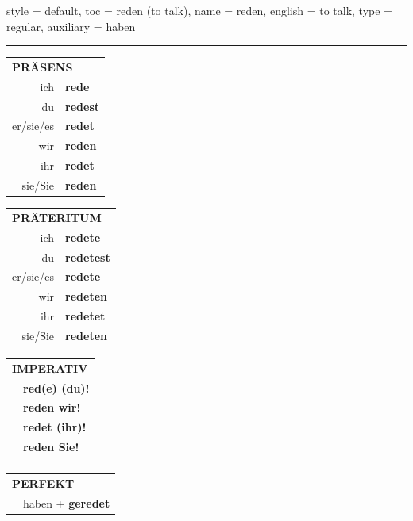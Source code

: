 \begin{verbentry}{
  style = {default},
  toc = {reden (to talk)},
  name = {reden},
  english = {to talk},
  type = {regular},
  auxiliary = {haben}
}
 
    
     \vspace{5pt}

    \hrule
    
    \vspace{5pt}

  \begin{tabular}{rl}
     \multicolumn{2}{l}{\textbf{PRÄSENS} }\\
    ich & \textbf{rede}\\
    du & \textbf{redest}\\
    er/sie/es & \textbf{redet}\\
    wir & \textbf{reden}\\
    ihr & \textbf{redet}\\
    sie/Sie & \textbf{reden}\\
  \end{tabular}
  \hfill
     \begin{tabular}{rl}
    \multicolumn{2}{l}{\textbf{PRÄTERITUM} }\\
    ich & \textbf{redete}\\
    du & \textbf{redetest}\\
    er/sie/es & \textbf{redete}\\
    wir & \textbf{redeten}\\
    ihr & \textbf{redetet}\\
    sie/Sie & \textbf{redeten}\\
  \end{tabular}
  \hfill
  \begin{tabular}{rl}
     \multicolumn{2}{l}{\textbf{IMPERATIV} }\\
   & \textbf{red(e) (du)!}\\
   & \textbf{reden wir!}\\
   & \textbf{redet (ihr)!}\\
   & \textbf{reden Sie!}\\
   & \vspace{10pt}
  \end{tabular}

    \vspace{10pt}

 \begin{tabular}{rl}
     \multicolumn{2}{l}{\textbf{PERFEKT}}\\
  &  haben + \textbf{geredet}\\
  \end{tabular}
\hfill
   \begin{tabular}{rl}
   

\end{tabular}
\end{verbentry}
